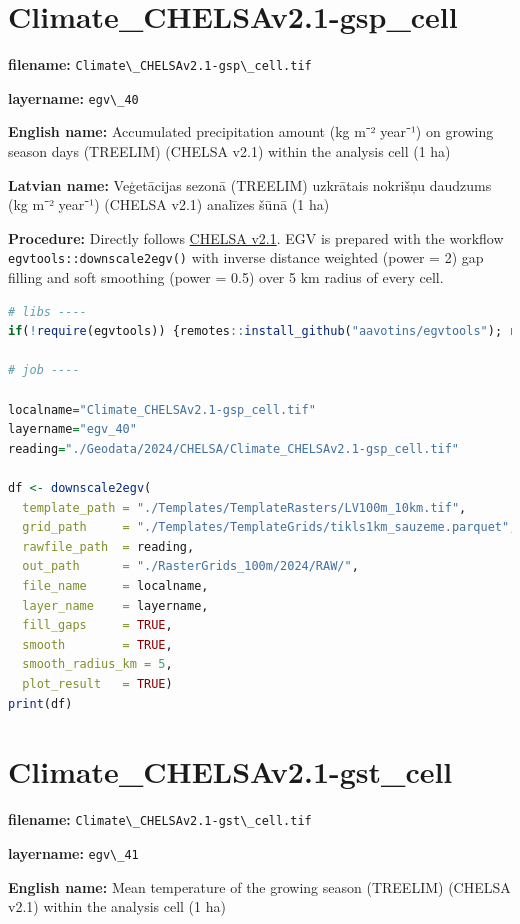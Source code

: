 \documentclass[
]{book}
\newcommand{\passthrough}[1]{#1}
\begin{document}
\section{Climate\_CHELSAv2.1-gsp\_cell}\label{ch06.040}

\textbf{filename:} \passthrough{\lstinline!Climate\_CHELSAv2.1-gsp\_cell.tif!}

\textbf{layername:} \passthrough{\lstinline!egv\_40!}

\textbf{English name:} Accumulated precipitation amount (kg m⁻² year⁻¹) on growing season days (TREELIM) (CHELSA v2.1) within the analysis cell (1 ha)

\textbf{Latvian name:} Veģetācijas sezonā (TREELIM) uzkrātais nokrišņu daudzums (kg m⁻² year⁻¹) (CHELSA v2.1) analīzes šūnā (1 ha)

\textbf{Procedure:} Directly follows \hyperref[Ch04.11]{CHELSA v2.1}. EGV is prepared with the
workflow \passthrough{\lstinline!egvtools::downscale2egv()!} with inverse distance weighted (power = 2)
gap filling and soft smoothing (power = 0.5) over 5 km radius of every cell.

\begin{lstlisting}[language=R]
# libs ----
if(!require(egvtools)) {remotes::install_github("aavotins/egvtools"); require(egvtools)}

# job ----

localname="Climate_CHELSAv2.1-gsp_cell.tif"
layername="egv_40"
reading="./Geodata/2024/CHELSA/Climate_CHELSAv2.1-gsp_cell.tif"

df <- downscale2egv(
  template_path = "./Templates/TemplateRasters/LV100m_10km.tif",
  grid_path     = "./Templates/TemplateGrids/tikls1km_sauzeme.parquet",
  rawfile_path  = reading,
  out_path      = "./RasterGrids_100m/2024/RAW/",
  file_name     = localname,
  layer_name    = layername,
  fill_gaps     = TRUE,
  smooth        = TRUE,
  smooth_radius_km = 5,
  plot_result   = TRUE)
print(df)
\end{lstlisting}

\section{Climate\_CHELSAv2.1-gst\_cell}\label{ch06.041}

\textbf{filename:} \passthrough{\lstinline!Climate\_CHELSAv2.1-gst\_cell.tif!}

\textbf{layername:} \passthrough{\lstinline!egv\_41!}

\textbf{English name:} Mean temperature of the growing season (TREELIM) (CHELSA v2.1) within the analysis cell (1 ha)
\end{document}
